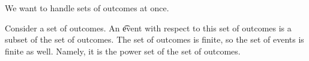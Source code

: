 

We want to handle sets of outcomes at once.


Consider a set of outcomes.
An \t{event} with respect to this set of outcomes is a subset of the set of outcomes.
The set of outcomes is finite, so the set of events is finite as well.
Namely, it is the power set of the set of outcomes.

\blankpage
